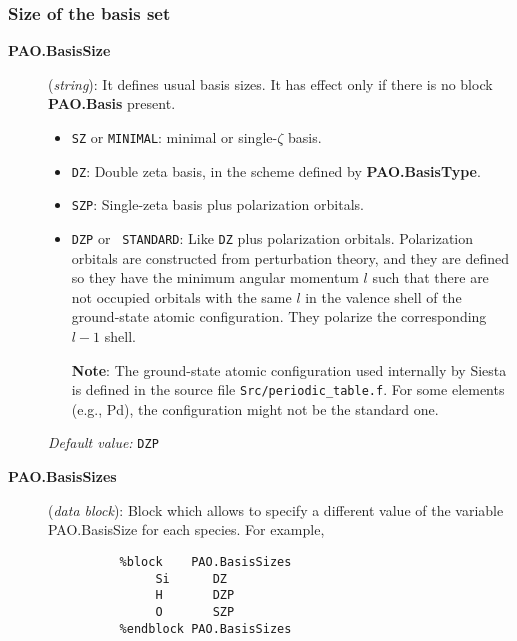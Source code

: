 \documentclass[11pt]{article}
\begin{document}
\subsubsection{Size of the basis set}
\begin{description}

\item[{\bf PAO.BasisSize}] ({\it string}):
It defines usual basis sizes. It has effect only if there is no
block {\bf PAO.Basis} present.

\begin{itemize}

\item {\tt SZ} or {\tt MINIMAL}: minimal or single-$\zeta$
basis.

\item {\tt DZ}: Double zeta basis, in the scheme
defined by {\bf PAO.BasisType}.

\item {\tt SZP}: Single-zeta basis plus polarization
orbitals.

\item {\tt DZP} or {\tt
STANDARD}: Like {\tt DZ} plus
polarization orbitals.  Polarization orbitals are constructed from
perturbation theory, and they are
defined so they have the minimum angular
momentum $l$ such that there are not occupied orbitals with the same
$l$ in the valence shell of the ground-state atomic
configuration. They polarize the corresponding $l-1$ shell.

{\bf Note}: The ground-state atomic configuration used internally
by {\sc Siesta} is defined in the source file {\tt Src/periodic\_table.f}.
For some elements (e.g., Pd), the configuration might not be the
standard one.

\end{itemize}

{\it Default value:} {\tt DZP}

\item[{\bf PAO.BasisSizes}]({\it data block}):
Block which allows to specify a different value of the variable
PAO.BasisSize for each species. For example,
\begin{verbatim}
          %block    PAO.BasisSizes
               Si      DZ
               H       DZP
               O       SZP
          %endblock PAO.BasisSizes
\end{verbatim}

\end{description}
\end{document}
